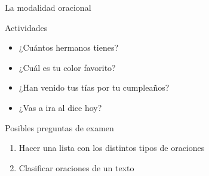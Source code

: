 \documentclass[ignorenonframetext,]{beamer}
\providecommand{\tightlist}{%
  \setlength{\itemsep}{0pt}\setlength{\parskip}{0pt}}
\begin{document}
\begin{frame}{La modalidad oracional}
\begin{block}{Actividades}
\begin{itemize}
  \begin{itemize}
  \tightlist
  \item
    ¿Cuántos hermanos tienes?
  \item
    ¿Cuál es tu color favorito?
  \item
    ¿Han venido tus tías por tu cumpleaños?
  \item
    ¿Vas a ira al dice hoy?
  \end{itemize}
\end{itemize}

\end{block}

\begin{block}{Posibles preguntas de examen}

\begin{enumerate}
\tightlist
\item
  Hacer una lista con los distintos tipos de oraciones
\item
  Clasificar oraciones de un texto
\end{enumerate}

\end{block}

\end{frame}
\end{document}
